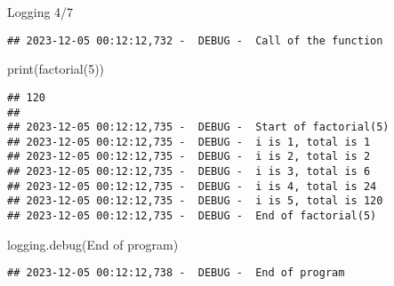 \documentclass[
  8pt,
  ignorenonframetext,
]{beamer}
\newenvironment{Shaded}{\begin{snugshade}}{\end{snugshade}}
\newcommand{\BuiltInTok}[1]{#1}
\newcommand{\DecValTok}[1]{\textcolor[rgb]{0.00,0.00,0.81}{#1}}
\newcommand{\NormalTok}[1]{#1}
\newcommand{\StringTok}[1]{\textcolor[rgb]{0.31,0.60,0.02}{#1}}
\begin{document}
\begin{frame}[fragile]{Logging 4/7}
\begin{verbatim}
## 2023-12-05 00:12:12,732 -  DEBUG -  Call of the function
\end{verbatim}

\begin{Shaded}
\begin{Highlighting}[]
\BuiltInTok{print}\NormalTok{(factorial(}\DecValTok{5}\NormalTok{))}
\end{Highlighting}
\end{Shaded}

\begin{verbatim}
## 120
## 
## 2023-12-05 00:12:12,735 -  DEBUG -  Start of factorial(5)
## 2023-12-05 00:12:12,735 -  DEBUG -  i is 1, total is 1
## 2023-12-05 00:12:12,735 -  DEBUG -  i is 2, total is 2
## 2023-12-05 00:12:12,735 -  DEBUG -  i is 3, total is 6
## 2023-12-05 00:12:12,735 -  DEBUG -  i is 4, total is 24
## 2023-12-05 00:12:12,735 -  DEBUG -  i is 5, total is 120
## 2023-12-05 00:12:12,735 -  DEBUG -  End of factorial(5)
\end{verbatim}

\begin{Shaded}
\begin{Highlighting}[]
\NormalTok{logging.debug(}\StringTok{\textquotesingle{}End of program\textquotesingle{}}\NormalTok{)}
\end{Highlighting}
\end{Shaded}

\begin{verbatim}
## 2023-12-05 00:12:12,738 -  DEBUG -  End of program
\end{verbatim}
\end{frame}
\end{document}
